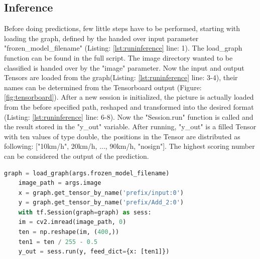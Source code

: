\subsection{Inference}
Before doing predictions, few little steps have to be performed, starting with loading the graph, defined by the handed over input parameter "frozen\_model\_filename" (Listing: \ref{lst:runinference} line: 1). The load\_graph function can be found in the full script. The image directory wanted to be classified is handed over by the "image" parameter. Now the input and output Tensors are loaded from the graph(Listing: \ref{lst:runinference} line: 3-4), their names can be determined from the Tensorboard output (Figure: \ref{fig:tensorboard}). After a new session is initialized, the picture is actually loaded from the before specified path, reshaped and transformed into the desired format (Listing: \ref{lst:runinference} line: 6-8). Now the "Session.run" function is called and the result stored in the "y\_out" variable. After running, "y\_out" is a filled Tensor with ten values of type double, the positions in the Tensor are distributed as following: ["10km/h", 20km/h, ..., 90km/h, "nosign"]. The highest scoring number can be considered the output of the prediction. 

\begin{minipage}{0.95\linewidth}
	
	\begin{lstlisting}[language=python, caption={Simplified excerpt of runinference.py}, label={lst:runinference},captionpos=b]
	graph = load_graph(args.frozen_model_filename)
	image_path = args.image
	x = graph.get_tensor_by_name('prefix/input:0')
	y = graph.get_tensor_by_name('prefix/Add_2:0')
	with tf.Session(graph=graph) as sess:
	im = cv2.imread(image_path, 0)
	ten = np.reshape(im, (400,))
	ten1 = ten / 255 - 0.5    
	y_out = sess.run(y, feed_dict={x: [ten1]})
	\end{lstlisting}
	
\end{minipage}



